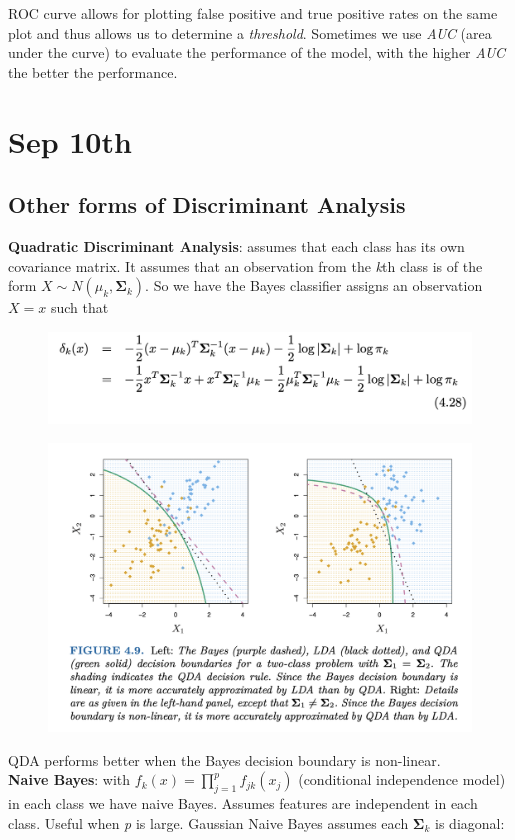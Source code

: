 \documentclass{article}
\begin{document}
ROC curve allows for plotting false positive and true positive rates on the same plot and thus allows us to determine a \textit{threshold}. Sometimes we use \textit{AUC} (area under the curve) to evaluate the performance of the model, with the higher \textit{AUC} the better the performance.

\section{Sep 10th}
\subsection{Other forms of Discriminant Analysis}

\textbf{Quadratic Discriminant Analysis}: assumes that each class has its own covariance matrix. It assumes that an observation from the \textit{k}th class is of the form $X \sim N(\mu_k, \boldsymbol{\Sigma}_k)$. So we have the Bayes classifier assigns an observation $X = x$ such that 
\begin{figure}[h!]
    \centering
    \includegraphics[width=0.75\linewidth]{QDA.png}
\end{figure}
\begin{figure}[h!]
    \centering
    \includegraphics[width=0.5\linewidth]{QDA_fig.png}
\end{figure}

QDA performs better when the Bayes decision boundary is non-linear.\\

\noindent\textbf{Naive Bayes}: with $\displaystyle f_k(x) = \prod_{j=1}^p f_{jk}(x_j)$ (conditional independence model) in each class we have naive Bayes. Assumes features are independent in each class. Useful when \textit{p} is large. Gaussian Naive Bayes assumes each $\boldsymbol{\Sigma}_k$ is diagonal:
\end{document}
